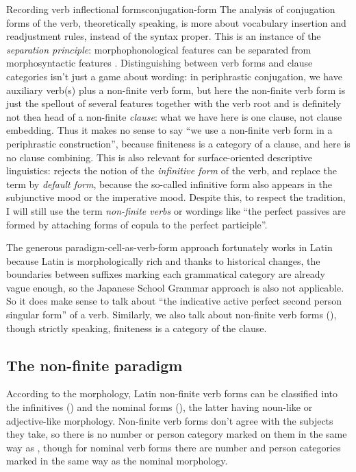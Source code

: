 \documentclass[a4paper, oneside]{report}
\newcommand*{\citepage}[1]{p.~{#1}}
\newcommand*{\term}[1]{\emph{#1}}
\begin{document}
\begin{infobox}{Recording verb inflectional forms}{conjugation-form}
    The analysis of conjugation forms of the verb, theoretically speaking,
    is more about vocabulary insertion and readjustment rules,
    instead of the syntax proper.
    This is an instance of the \emph{separation principle}:
    morphophonological features can be separated from morphosyntactic features
    \citep{embick2000features}.
    Distinguishing between verb forms and clause categories isn't just a game about wording:
    in periphrastic conjugation,
    we have auxiliary verb(s) plus a non-finite verb form,
    but here the non-finite verb form is just the spellout of several features together with the verb root 
    and is definitely not thea head of a non-finite \emph{clause}:
    what we have here is one clause, not clause embedding.
    Thus it makes no sense to say ``we use a non-finite verb form in a periphrastic construction'',
    because finiteness is a category of a clause,
    and here is no clause combining.
    This is also relevant for surface-oriented descriptive linguistics:
    \citet[\citepage{74,83}]{cgel} rejects the notion of the \term{infinitive form} of the verb,
    and replace the term by \term{default form},
    because the so-called infinitive form also appears in the subjunctive mood
    or the imperative mood. 
    Despite this, to respect the tradition, 
    I will still use the term \term{non-finite verbs} 
    or wordings like ``the perfect passives are formed by attaching forms of copula to the perfect participle''.

    The generous paradigm-cell-as-verb-form approach fortunately works in Latin 
    because Latin is morphologically rich
    and thanks to historical changes,
    the boundaries between suffixes marking each grammatical category 
    are already vague enough, so the Japanese School Grammar approach is also not applicable. 
    So it does make sense to talk about 
    ``the indicative active perfect second person singular form'' of a verb.
    Similarly, we also talk about non-finite verb forms (),
    though strictly speaking, finiteness is a category of the clause.
\end{infobox}

\subsection{The non-finite paradigm}\label{sec:non-finite-abs}

According to the morphology,
Latin non-finite verb forms can be classified into the infinitives ()
and the nominal forms (),
the latter having noun-like or adjective-like morphology.
Non-finite verb forms don't agree with the subjects they take,
so there is no number or person category marked on them in the same way as ,
though for nominal verb forms there are number and person categories 
marked in the same way as the nominal morphology.
\end{document}

